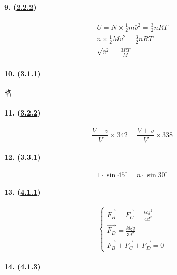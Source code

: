 \paragraph{9. (\hyperref[subsec:2.2.2]{2.2.2})}

\begin{gather*}
    U=N\times\frac12m\bar{v}^2=\frac32nRT\\
    n\times\frac12M\bar{v}^2=\frac32nRT\\
    \sqrt{\bar{v}^2}=\frac{3RT}{M}
\end{gather*}

\paragraph{10. (\hyperref[subsec:3.1.1]{3.1.1})} 略
\paragraph{11. (\hyperref[subsec:3.2.2]{3.2.2})}

\begin{equation*}
    \frac{V-v}{V}\times342=\frac{V+v}{V}\times338
\end{equation*}

\paragraph{12. (\hyperref[subsec:3.3.1]{3.3.1})}

\begin{equation*}
    1\cdot\sin45^\circ=n\cdot\sin30^\circ
\end{equation*}

\paragraph{13. (\hyperref[subsec:4.1.1]{4.1.1})}

\begin{equation*}
    \begin{cases}
        \vec{F_B}=\vec{F_C}=\frac{kQ^2}{4d^2}\\
        \vec{F_D}=\frac{kQq}{3d^2}\\
        \vec{F_B}+\vec{F_C}+\vec{F_D}=0
    \end{cases}
\end{equation*}

\paragraph{14. (\hyperref[subsec:4.1.3]{4.1.3})}

